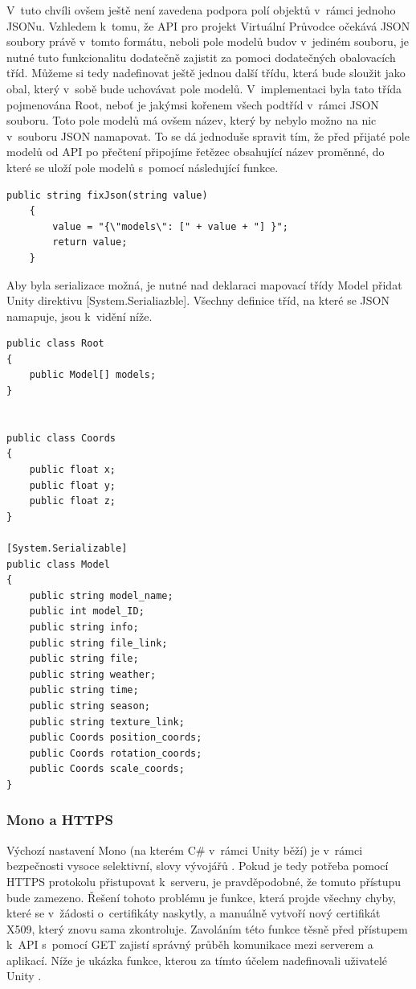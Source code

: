 \documentclass[thesis=B,czech]{FITthesis}[2012/06/26]
\begin{document}
V~tuto chvíli ovšem ještě není zavedena podpora polí objektů v~rámci jednoho JSONu. \cite{UnityJSON} Vzhledem k~tomu, že API pro projekt Virtuální Průvodce očekává JSON soubory právě v~tomto formátu, neboli pole modelů budov v~jediném souboru, je nutné tuto funkcionalitu dodatečně zajistit za pomoci dodatečných obalovacích tříd. Můžeme si tedy nadefinovat ještě jednou další třídu, která bude sloužit jako obal, který v~sobě bude uchovávat pole modelů. V~implementaci byla tato třída pojmenována Root, neboť je jakýmsi kořenem všech podtříd v~rámci JSON souboru. Toto pole modelů má ovšem název, který by nebylo možno na nic v~souboru JSON namapovat. To se dá jednoduše spravit tím, že před přijaté pole modelů od API po přečtení připojíme řetězec obsahující název proměnné, do které se uloží pole modelů s~pomocí následující funkce.

\begin{lstlisting}[frame=single]
public string fixJson(string value)
    {
        value = "{\"models\": [" + value + "] }";
        return value;
    }

\end{lstlisting}

Aby byla serializace možná, je nutné nad deklaraci mapovací třídy Model přidat Unity direktivu [System.Serialiazble]. Všechny definice tříd, na které se JSON namapuje, jsou k~vidění níže. 

\begin{lstlisting}[frame=single]
public class Root
{
    public Model[] models;
}


public class Coords 
{
    public float x;
    public float y;
    public float z;
}

[System.Serializable]
public class Model
{
    public string model_name;
    public int model_ID;
    public string info;
    public string file_link;
    public string file;
    public string weather;
    public string time;
    public string season;
    public string texture_link;
    public Coords position_coords;
    public Coords rotation_coords;
    public Coords scale_coords;
}
\end{lstlisting}

	\subsubsection{Mono a HTTPS}
	
	Výchozí nastavení Mono (na kterém C\# v~rámci Unity běží) je v~rámci bezpečnosti vysoce selektivní, slovy vývojářů  \cite{mono}. Pokud je tedy potřeba pomocí HTTPS protokolu přistupovat k~serveru, je pravděpodobné, že tomuto přístupu bude zamezeno. Řešení tohoto problému je funkce, která projde všechny chyby, které se v~žádosti o~certifikáty naskytly, a manuálně vytvoří nový certifikát X509, který znovu sama zkontroluje. Zavoláním této funkce těsně před přístupem k~API s~pomocí GET zajistí správný průběh komunikace mezi serverem a aplikací. Níže je ukázka funkce, kterou za tímto účelem nadefinovali uživatelé Unity \cite{unityFAQ}.
	
\end{document}
